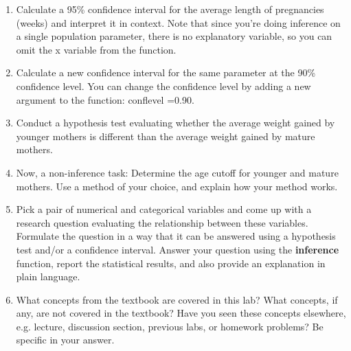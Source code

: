 \documentclass{article}\usepackage[]{graphicx}\usepackage[]{color}
\newcommand{\hlnum}[1]{\textcolor[rgb]{0.686,0.059,0.569}{#1}}%
\newcommand{\hlstd}[1]{\textcolor[rgb]{0.345,0.345,0.345}{#1}}%
\newcommand{\hlkwc}[1]{\textcolor[rgb]{0.333,0.667,0.333}{#1}}%
\newcommand{\hlkwd}[1]{\textcolor[rgb]{0.737,0.353,0.396}{\textbf{#1}}}%
\begin{document}
\begin{enumerate}

\item Calculate a 95\% confidence interval for the average length of pregnancies (\hlstd{weeks}) and interpret it in context. Note that since you're doing inference on a single population parameter, there is no explanatory variable, so you can omit the \hlkwc{x} variable from the function.

\item Calculate a new confidence interval for the same parameter at the 90\% confidence level. You can change the confidence level by adding a new argument to the function: \hlkwc{conflevel =}\hlnum{0.90}.

\item Conduct a hypothesis test evaluating whether the average weight gained by younger mothers is different than the average weight gained by mature mothers.

\item Now, a non-inference task: Determine the age cutoff for younger and mature mothers. Use a method of your choice, and explain how your method works.

\item Pick a pair of numerical and categorical variables and come up with a research question evaluating the relationship between these variables. Formulate the question in a way that it can be answered using a hypothesis test and/or a confidence interval. Answer your question using the \hlkwd{inference} function, report the statistical results, and also provide an explanation in plain language.

\item What concepts from the textbook are covered in this lab?  What concepts, if any, are not covered in the textbook?  Have you seen these concepts elsewhere, e.g. lecture, discussion section, previous labs, or homework problems?  Be specific in your answer.

\end{enumerate}

 
\end{document}
